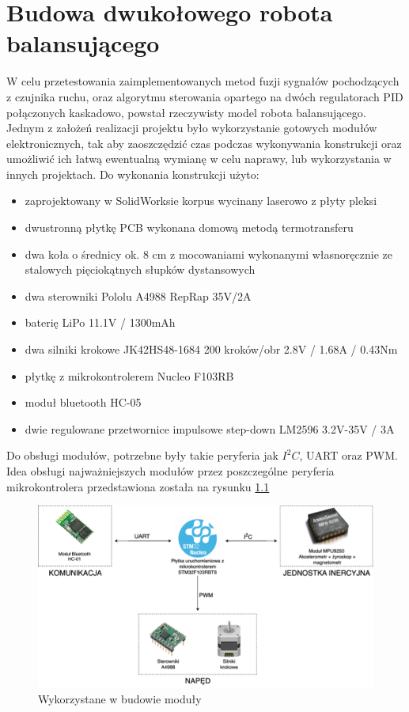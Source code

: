 \chapter{Budowa dwukołowego robota balansującego}
\label{chap:budowa}

W celu przetestowania zaimplementowanych metod fuzji sygnałów pochodzących z czujnika ruchu, oraz algorytmu sterowania opartego na dwóch regulatorach PID połączonych kaskadowo, powstał rzeczywisty model robota balansującego. Jednym z założeń realizacji projektu było wykorzystanie gotowych modułów elektronicznych, tak aby zaoszczędzić czas podczas wykonywania konstrukcji oraz umożliwić ich łatwą ewentualną wymianę w celu naprawy, lub wykorzystania w innych projektach. Do wykonania konstrukcji użyto:
\begin{itemize}
    \item zaprojektowany w SolidWorksie korpus wycinany laserowo z płyty pleksi
    \item dwustronną płytkę PCB wykonana domową metodą termotransferu
    \item dwa koła o średnicy ok. 8 cm z mocowaniami wykonanymi własnoręcznie ze stalowych pięciokątnych słupków dystansowych
    \item dwa sterowniki Pololu A4988 RepRap 35V/2A
    \item baterię LiPo 11.1V / 1300mAh
    \item dwa silniki krokowe JK42HS48-1684 200 kroków/obr 2.8V / 1.68A / 0.43Nm
    \item płytkę z mikrokontrolerem Nucleo F103RB
    \item moduł bluetooth HC-05
    \item dwie regulowane przetwornice impulsowe step-down LM2596 3.2V-35V / 3A
\end{itemize}

Do obsługi modułów, potrzebne były takie peryferia jak $I^2C$, UART oraz PWM. Idea obsługi najważniejszych modułów przez poszczególne peryferia mikrokontrolera przedstawiona została na rysunku \ref{Moduly}

\begin{figure}[h!]
    \centering
    \includegraphics[width=1\textwidth]{Rysunki/Rozdzial05/Platforma_sprzetowa.png}
    \caption{Wykorzystane w budowie moduły}
    \label{Moduly}
\end{figure}

